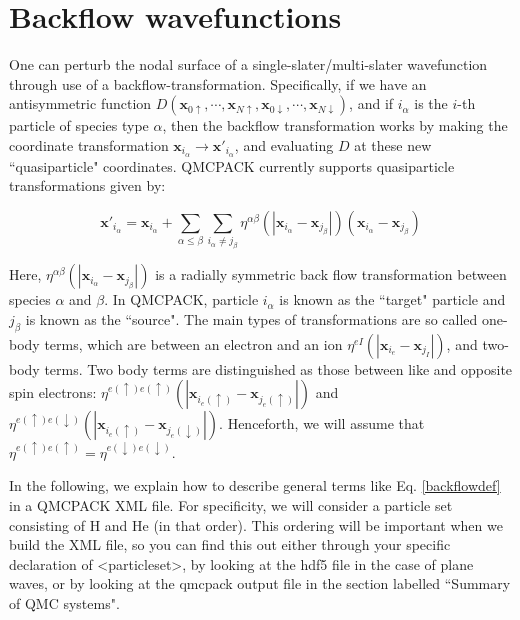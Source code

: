 \section{Backflow wavefunctions}

\label{sec:backflow}

One can perturb the nodal surface of a single-slater/multi-slater wavefunction through use of a backflow-transformation.  Specifically, if we have an antisymmetric function $D(\mathbf{x}_{0\uparrow},\cdots,\mathbf{x}_{N\uparrow}, \mathbf{x}_{0\downarrow},\cdots,\mathbf{x}_{N\downarrow})$, and if $i_\alpha$ is the $i$-th particle of species type $\alpha$, then the backflow transformation works by making the coordinate transformation $\mathbf{x}_{i_\alpha} \to \mathbf{x}'_{i_\alpha}$, and evaluating $D$ at these new ``quasiparticle" coordinates.  QMCPACK currently supports quasiparticle transformations given by:

\begin{equation}\label{backflowdef}
\mathbf{x}'_{i_\alpha}=\mathbf{x}_{i_\alpha}+\sum_{\alpha \leq \beta} \sum_{i_\alpha \neq j_\beta} \eta^{\alpha\beta}(|\mathbf{x}_{i_\alpha}-\mathbf{x}_{j_\beta}|)(\mathbf{x}_{i_\alpha}-\mathbf{x}_{j_\beta})
\end{equation}

Here, $\eta^{\alpha\beta}(|\mathbf{x}_{i_\alpha}-\mathbf{x}_{j_\beta}|)$ is a radially symmetric back flow transformation between species $\alpha$ and $\beta$.  In QMCPACK, particle $i_\alpha$ is known as the ``target" particle and $j_\beta$ is known as the ``source".  The main types of transformations are so called one-body terms, which are between an electron and an ion $\eta^{eI}(|\mathbf{x}_{i_e}-\mathbf{x}_{j_I}|)$, and two-body terms.  Two body terms are distinguished as those between like and opposite spin electrons:  $\eta^{e(\uparrow)e(\uparrow)}(|\mathbf{x}_{i_e(\uparrow)}-\mathbf{x}_{j_e(\uparrow)}|)$ and  $\eta^{e(\uparrow)e(\downarrow)}(|\mathbf{x}_{i_e(\uparrow)}-\mathbf{x}_{j_e(\downarrow)}|)$.  Henceforth, we will assume that $\eta^{e(\uparrow)e(\uparrow)}=\eta^{e(\downarrow)e(\downarrow)}$.

In the following, we explain how to describe general terms like Eq. \ref{backflowdef} in a QMCPACK XML file.  For specificity, we will consider a particle set consisting of H and He (in that order).  This ordering will be important when we build the XML file, so you can find this out either through your specific declaration of <particleset>, by looking at the hdf5 file in the case of plane waves, or by looking at the qmcpack output file in the section labelled ``Summary of QMC systems".  
